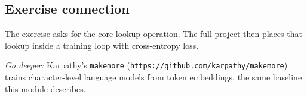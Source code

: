 \subsection*{Exercise connection}
The exercise asks for the core lookup operation. The full project then places
that lookup inside a training loop with cross-entropy loss.

\medskip
\noindent\textit{Go deeper:} Karpathy's \texttt{makemore}
(\texttt{https://github.com/karpathy/makemore}) trains character-level language
models from token embeddings, the same baseline this module describes.
